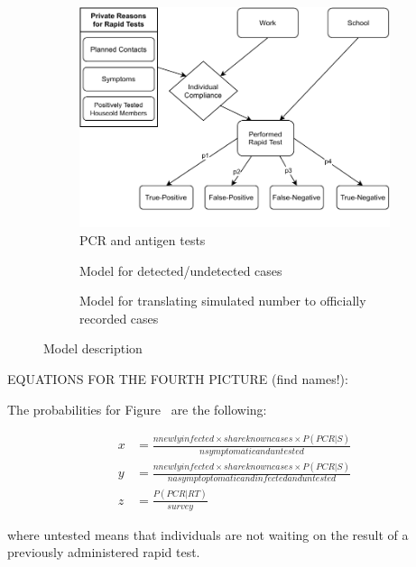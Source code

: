 \begin{figure}[!tp]
\begin{subfigure}[b]{0.425\textwidth}
        \includegraphics[width=\textwidth]{../figures/model-graph-bottom-left}
        \caption{{\small PCR and antigen tests}}
        \label{fig:pcr_antigen_tests}
    \end{subfigure}
    \hfill
    \begin{subfigure}[b]{0.425\textwidth}
        \centering

        Model for detected/undetected cases

        \caption{{\small Model for translating simulated number to officially recorded
        cases}}
        \label{fig:model_for_official_cases}
    \end{subfigure}

    \caption{Model description}
    \label{fig:model-description}

\end{figure}

EQUATIONS FOR THE FOURTH PICTURE (find names!):

The probabilities for Figure~ are the following:

\begin{align*}
    x &= \frac{nnewlyinfected \times shareknowncases \times P(PCR | S)}{nsymptomaticanduntested} \\
    y &= \frac{nnewlyinfected \times shareknowncases \times P(PCR | S)}{nasymptoptomaticandinfectedanduntested} \\
    z &= \frac{P(PCR | RT)}{survey}
\end{align*}

where untested means that individuals are not waiting on the result of a previously
administered rapid test.

